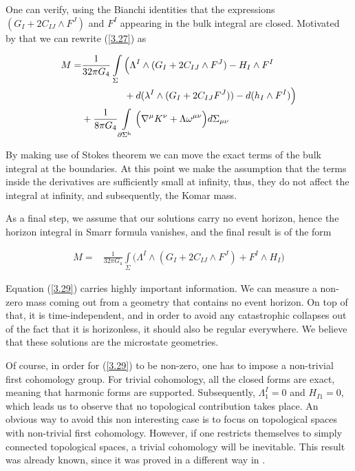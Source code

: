 \documentclass[a4paper,notitlepage]{report}
\begin{document}
\vspace{0.5 em}
One can verify, using the Bianchi identities that the expressions $(G_I + 2C_{IJ} \wedge F^J)$ and $F^I$ appearing in the bulk integral are closed. Motivated by that we can rewrite (\ref{3.27}) as

\begin{align} \label{3.28}
M =& \frac{1}{32\pi G_{4}} \int\limits_{\Sigma} \Big( \Lambda^I \wedge (G_I + 2C_{IJ} \wedge F^J ) - H_{I} \wedge F^I \notag\\
& \:\:\:\:\:\:\:\:\:\:\:\:\:\:\:\:\:\:\:\: + d(\lambda^I \wedge (G_I + 2C_{IJ} F^J)) - d(h_{I} \wedge F^I) \Big) \notag\\
&+ \frac{1}{8\pi G_{4}} \int\limits_{\partial \Sigma^{\text{h}}} \Big( \nabla^{\mu} K^{\nu} + \Lambda \omega^{\mu\nu} \Big) d\Sigma_{\mu\nu}
\end{align}

\vspace{0.5 em}
By making use of Stokes theorem we can move the exact terms of the bulk integral at the boundaries. At this point we make the assumption that the terms inside the derivatives are sufficiently small at infinity, thus, they do not affect the integral at infinity, and subsequently, the Komar mass.

As a final step, we assume that our solutions carry no event horizon, hence the horizon integral in Smarr formula vanishes, and the final result is of the form

\begin{align} \label{3.29}
M =& \frac{1}{32\pi G_{4}} \int\limits_{\Sigma} \Big( \Lambda^I \wedge (G_I + 2C_{IJ} \wedge F^J ) + F^I \wedge H_{I}   \Big)
\end{align}

\vspace{0.5 em}
Equation (\ref{3.29}) carries  highly important information. We can measure a non-zero mass coming out from a geometry that contains no event horizon. On top of that, it is time-independent, and in order to avoid any catastrophic collapses out of the fact that it is horizonless, it should also be regular everywhere. We believe that these solutions are the microstate geometries.

Of course, in order for (\ref{3.29}) to be non-zero, one has to impose a non-trivial first cohomology group. For trivial cohomology, all the closed forms are exact, meaning that harmonic forms are supported. Subsequently, $\Lambda^I_1 =0$ and $H_{I1}=0$, which leads us to observe that no topological contribution takes place. An obvious way to avoid this non interesting case is to focus on topological spaces with non-trivial first cohomology. However, if one restricts themselves to simply connected topological spaces, a trivial cohomology will be inevitable. This result was already known, since it was proved in a different way in \cite{breitenlohner19884}.
\end{document}
